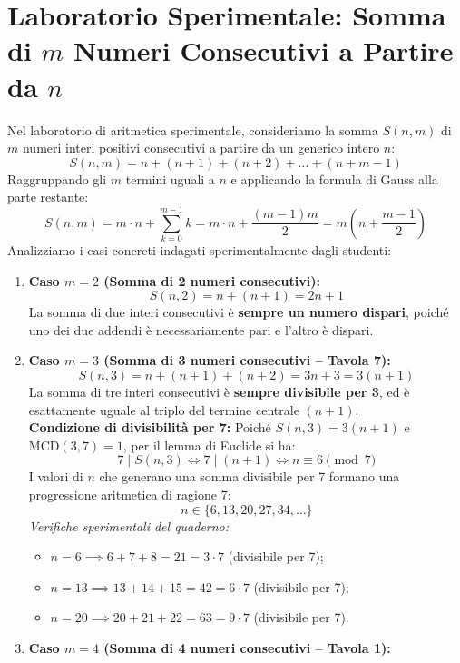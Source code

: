 \documentclass[11pt,a4paper,oneside]{report}
\begin{document}
\section{Laboratorio Sperimentale: Somma di \texorpdfstring{$m$}{m} Numeri Consecutivi a Partire da \texorpdfstring{$n$}{n}}
\begin{laboratorio}
Nel laboratorio di aritmetica sperimentale, consideriamo la somma $S(n, m)$ di $m$ numeri interi positivi consecutivi a partire da un generico intero $n$:
\[
S(n, m) = n + (n+1) + (n+2) + \dots + (n + m - 1)
\]
Raggruppando gli $m$ termini uguali a $n$ e applicando la formula di Gauss alla parte restante:
\[
S(n, m) = m \cdot n + \sum_{k=0}^{m-1} k = m \cdot n + \frac{(m-1)m}{2} = m \left( n + \frac{m-1}{2} \right)
\]
Analizziamo i casi concreti indagati sperimentalmente dagli studenti:
\begin{enumerate}[leftmargin=2em]
  \item \textbf{Caso $m = 2$ (Somma di 2 numeri consecutivi):}
  \[
  S(n, 2) = n + (n+1) = 2n + 1
  \]
  La somma di due interi consecutivi \`e \textbf{sempre un numero dispari}, poich\'e uno dei due addendi \`e necessariamente pari e l'altro \`e dispari.
  \item \textbf{Caso $m = 3$ (Somma di 3 numeri consecutivi -- Tavola 7):}
  \[
  S(n, 3) = n + (n+1) + (n+2) = 3n + 3 = 3(n+1)
  \]
  La somma di tre interi consecutivi \`e \textbf{sempre divisibile per 3}, ed \`e esattamente uguale al triplo del termine centrale $(n+1)$.\\
  \textbf{Condizione di divisibilit\`a per 7:} Poich\'e $S(n, 3) = 3(n+1)$ e $\mathrm{MCD}(3, 7) = 1$, per il lemma di Euclide si ha:
  \[
  7 \mid S(n, 3) \iff 7 \mid (n+1) \iff n \equiv 6 \pmod 7
  \]
  I valori di $n$ che generano una somma divisibile per 7 formano una progressione aritmetica di ragione 7:
  \[
  n \in \{6, 13, 20, 27, 34, \dots\}
  \]
  \textit{Verifiche sperimentali del quaderno:}
  \begin{itemize}
    \item $n = 6 \implies 6 + 7 + 8 = 21 = 3 \cdot 7$ (divisibile per 7);
    \item $n = 13 \implies 13 + 14 + 15 = 42 = 6 \cdot 7$ (divisibile per 7);
    \item $n = 20 \implies 20 + 21 + 22 = 63 = 9 \cdot 7$ (divisibile per 7).
  \end{itemize}
  \item \textbf{Caso $m = 4$ (Somma di 4 numeri consecutivi -- Tavola 1):}

\end{enumerate}
\end{laboratorio}
\end{document}

